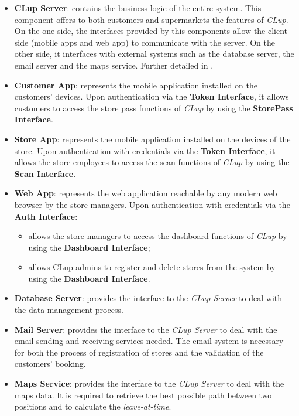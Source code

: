 \begin{itemize}
	\item \textbf{CLup Server}: contains the business logic of the entire system. This component offers to both customers and supermarkets the features of \textit{CLup}. On the one side, the interfaces provided by this components allow the client side (mobile apps and web app) to communicate with the server. On the other side, it interfaces with external systems such as the database server, the email server and the maps service. Further detailed in .
	
	\item \textbf{Customer App}: represents the mobile application installed on the customers' devices. Upon authentication via the \textbf{Token Interface}, it allows customers to access the store pass functions of \textit{CLup} by using the \textbf{StorePass Interface}.
	
	\item \textbf{Store App}: represents the mobile application	installed on the devices of the store. Upon authentication with credentials via the \textbf{Token Interface}, it allows the store employees to access the scan functions of \textit{CLup} by using the \textbf{Scan Interface}.
	
	\item \textbf{Web App}: represents the web application reachable by any modern web browser by the store managers. Upon authentication with credentials via the \textbf{Auth Interface}:
	\begin{itemize}
		\item allows the store managers to access the dashboard functions of \textit{CLup} by using the \textbf{Dashboard Interface};
		\item allows CLup admins to register and delete stores from the system by using the \textbf{Dashboard Interface}.
	\end{itemize}
	
	\item \textbf{Database Server}:	provides the interface to the \textit{CLup Server} to deal with the data management process. 
	
	\item \textbf{Mail Server}: provides the interface to the \textit{CLup Server} to deal with the email sending and receiving services needed. The email system is necessary for both the process of registration of stores and the validation of the customers' booking.
	
	\item \textbf{Maps Service}: provides the interface to the \textit{CLup Server} to deal with the maps data. It is required to retrieve the best possible path between two positions and to calculate the \textit{leave-at-time}.
\end{itemize}


